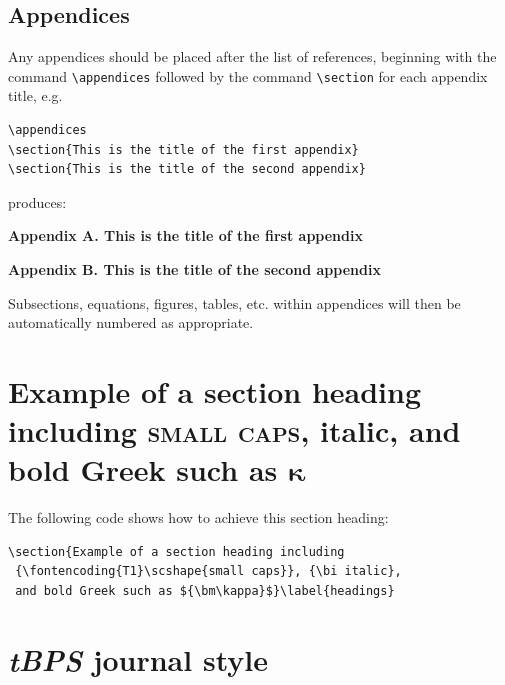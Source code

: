 \documentclass{tBPS2e}
\theoremstyle{plain}
\theoremstyle{definition}
\theoremstyle{remark}
\begin{document}
\subsection{Appendices}\label{appendices}

Any appendices should be placed after the list of references, beginning with the
command \verb"\appendices" followed by the command \verb"\section" for each appendix title, e.g.
\begin{verbatim}
\appendices
\section{This is the title of the first appendix}
\section{This is the title of the second appendix}
\end{verbatim}
\noindent produces:\medskip

\noindent\textbf{Appendix A. This is the title of the first appendix}\vspace{12pt}

\noindent\textbf{Appendix B. This is the title of the second appendix}

\medskip
\noindent Subsections, equations, figures, tables, etc. within appendices will then be automatically numbered as appropriate.


\section{Example of a section heading including {\scshape{small caps}},
   {\bi italic}, and bold Greek such as ${\bm\kappa}$}\label{headings}

The following code shows how to achieve this section heading:
\begin{verbatim}
\section{Example of a section heading including
 {\fontencoding{T1}\scshape{small caps}}, {\bi italic},
 and bold Greek such as ${\bm\kappa}$}\label{headings}
\end{verbatim}


\section{\textit{tBPS} journal style}
\end{document}
